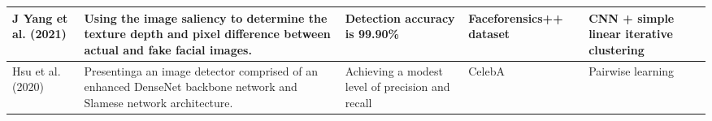 \newpage
\begin{tabularx}{\textwidth}{|X|X|X|X|X|}\hline
  J Yang et al. (2021) \cite{yang2021detecting} & Using the image saliency to determine the texture depth and pixel difference between actual and fake facial images.& Detection accuracy is 99.90\% & Faceforensics++ dataset & CNN + simple linear iterative clustering \\ \hline  

  Hsu et al.(2020) \cite{hung2021multi} & Presentinga an image detector comprised of an enhanced DenseNet backbone network and Slamese network architecture. & Achieving a modest level of precision and recall & CelebA & Pairwise learning \\ \hline
\end{tabularx}
